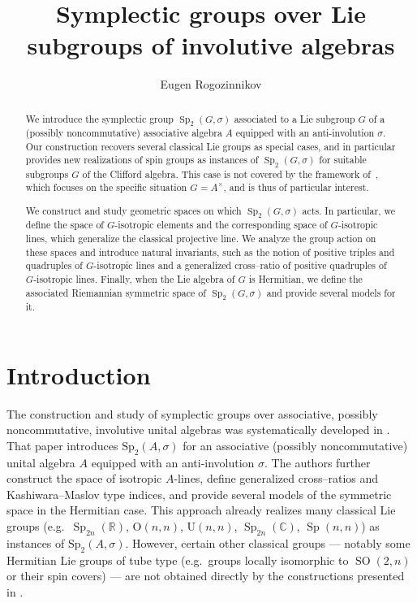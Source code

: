\documentclass[a4paper,oneside,11pt]{amsart}
\author{Eugen Rogozinnikov}
\DeclareMathOperator{\Sp}{Sp}
\DeclareMathOperator{\SO}{SO}
\theoremstyle{plain}
\theoremstyle{definition}
\theoremstyle{remark}
\begin{document}
\sloppy
\begin{abstract}
We introduce the symplectic group $\Sp_2(G, \sigma)$ associated to a Lie subgroup $G$ of a (possibly noncommutative) associative algebra $A$ equipped with an anti-involution $\sigma$. Our construction recovers several classical Lie groups as special cases, and in particular provides new realizations of spin groups as instances of $\Sp_2(G, \sigma)$ for suitable subgroups $G$ of the Clifford algebra. This case is not covered by the framework of~\cite{ABRRW}, which focuses on the specific situation $G = A^\times$, and is thus of particular interest.

We construct and study geometric spaces on which $\Sp_2(G, \sigma)$ acts. In particular, we define the space of $G$-isotropic elements and the corresponding space of $G$-isotropic lines, which generalize the classical projective line. We analyze the group action on these spaces and introduce natural invariants, such as the notion of positive triples and quadruples of $G$-isotropic lines and a generalized cross--ratio of positive quadruples of $G$-isotropic lines. Finally, when the Lie algebra of $G$ is Hermitian, we define the associated Riemannian symmetric space of $\Sp_2(G,\sigma)$ and provide several models for it.
\end{abstract}

\title{Symplectic groups over Lie subgroups of involutive algebras}

\maketitle
\tableofcontents

\section{Introduction}

The construction and study of symplectic groups over associative, possibly noncommutative, involutive unital algebras was systematically developed in \cite{ABRRW}. That paper introduces $\mathrm{Sp}_2(A,\sigma)$ for an associative (possibly noncommutative) unital algebra $A$ equipped with an anti-involution $\sigma$. The authors further construct the space of isotropic $A$-lines, define generalized cross--ratios and Kashiwara--Maslov type indices, and provide several models of the symmetric space in the Hermitian case. This approach already realizes many classical Lie groups (e.g.\ $\Sp_{2n}(\mathbb R)$, $\mathrm O(n,n)$, $\mathrm U(n,n)$, $\Sp_{2n}(\mathbb C)$, $\Sp(n,n)$) as instances of $\mathrm{Sp}_2(A,\sigma)$. However, certain other classical groups --- notably some Hermitian Lie groups of tube type (e.g.\ groups locally isomorphic to $\SO(2,n)$ or their spin covers) --- are not obtained directly by the constructions presented in \cite{ABRRW}.
\end{document}
